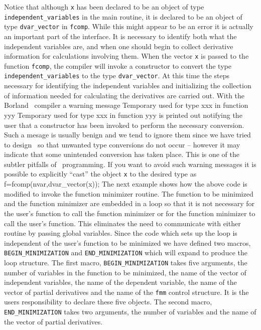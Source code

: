 \documentclass[12pt]{book}
\begin{document}
Notice that although {\tt x} has been declared to be an object of
type\linebreak
{\tt independent\_variables} in the main routine, it is declared to
be an object of type {\tt dvar\_vector} in {\tt fcomp}. While this might
appear to be an error it is actually an important part of the
interface. It is necessary to identify both what the
independent variables are, and when one should begin to collect derivative
information for calculations involving them. When the vector
{\tt x} is passed to the function {\tt fcomp}, the compiler will
invoke a constructor to convert the type
{\tt independent\_variables} to the type {\tt dvar\_vector}.
At this time the steps necessary for
identifying the independent variables and initializing the
collection of information needed for calculating the derivatives 
 are carried out. With the Borland \cplus\ compiler
a warning message
 {Temporary used for type xxx in function yyy}
\beginexample
Temporary used for type xxx in function yyy
\endexample
\noindent is printed
out notifying the user that a constructor has been invoked to perform
the necessary conversion. 
Such a mesage is usually benign and we tend to ignore them since we
have tried to design \AD\ so that unwanted type conversions do
not occur -- however it may indicate that some
unintended conversion has taken place. This is one of
the subtler pitfalls of \cplus\ programming. 
If you want to avoid such warning messages
it is possible to explicitly ``cast'' the object {\tt x} to the desired type
as
\beginexample
  f=fcomp(nvar,dvar_vector(x));
\endexample
{}
The next example shows how the above code is modified to 
invoke the function minimizer routine. The function to
be minimized and the function minimizer are embedded in a loop
so that it is not necessary for the user's function to call the
function minimizer or for the function minimizer to call the
user's function. This eliminates the need to communicate with
either routine by passing global variables.  Since the code which sets up 
the loop is independent of the user's function to be minimized we have
defined two macros, {\tt BEGIN\_MINIMIZATION} and {\tt END\_MINIMIZATION}
which will expand to produce the loop structure. The first macro, 
{\tt BEGIN\_MINIMIZATION} takes five arguments, the number of variables 
in the function to be minimized, the name of the vector of independent 
variables, the name of the dependent variable, the name of the 
vector of partial derivatives and the name of the {\tt fmm} control structure.
 It is the users
responsibility to declare these five objects.
The second macro, 
{\tt END\_MINIMIZATION} takes two arguments, the number of variables and
the name of the vector of partial derivatives. 
\bigbreak
{}
\end{document}
